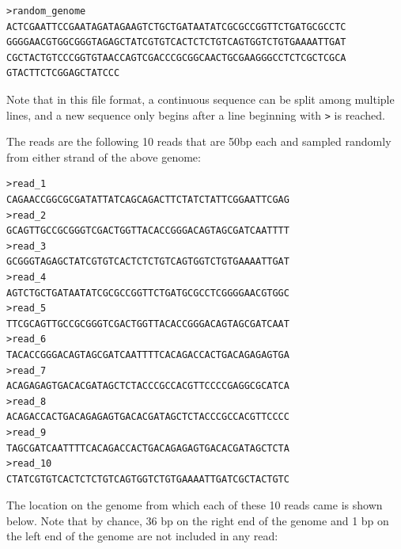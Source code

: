 \documentclass[12pt]{article}
\begin{document}

\begin{verbatim}
>random_genome
ACTCGAATTCCGAATAGATAGAAGTCTGCTGATAATATCGCGCCGGTTCTGATGCGCCTC
GGGGAACGTGGCGGGTAGAGCTATCGTGTCACTCTCTGTCAGTGGTCTGTGAAAATTGAT
CGCTACTGTCCCGGTGTAACCAGTCGACCCGCGGCAACTGCGAAGGGCCTCTCGCTCGCA
GTACTTCTCGGAGCTATCCC
\end{verbatim}

Note that in this file format, a continuous sequence can be split among multiple
lines, and a new sequence only begins after a line beginning with {\tt >} is
reached.

The reads are the following 10 reads that are 50bp each and sampled randomly
from either strand of the above genome:

\begin{verbatim}
>read_1
CAGAACCGGCGCGATATTATCAGCAGACTTCTATCTATTCGGAATTCGAG
>read_2
GCAGTTGCCGCGGGTCGACTGGTTACACCGGGACAGTAGCGATCAATTTT
>read_3
GCGGGTAGAGCTATCGTGTCACTCTCTGTCAGTGGTCTGTGAAAATTGAT
>read_4
AGTCTGCTGATAATATCGCGCCGGTTCTGATGCGCCTCGGGGAACGTGGC
>read_5
TTCGCAGTTGCCGCGGGTCGACTGGTTACACCGGGACAGTAGCGATCAAT
>read_6
TACACCGGGACAGTAGCGATCAATTTTCACAGACCACTGACAGAGAGTGA
>read_7
ACAGAGAGTGACACGATAGCTCTACCCGCCACGTTCCCCGAGGCGCATCA
>read_8
ACAGACCACTGACAGAGAGTGACACGATAGCTCTACCCGCCACGTTCCCC
>read_9
TAGCGATCAATTTTCACAGACCACTGACAGAGAGTGACACGATAGCTCTA
>read_10
CTATCGTGTCACTCTCTGTCAGTGGTCTGTGAAAATTGATCGCTACTGTC
\end{verbatim}

The location on the genome from which each of these 10 reads came is shown
below.  Note that by chance, 36 bp on the right end of the genome and 1 bp on
the left end of the genome are not included in any read:


\setcounter{forwardReads}{0}
\setcounter{rcReads}{1}

\newcommand{\ForwardRead}[2]{
	\addtocounter{readNumber}{1}
	\addtocounter{forwardReads}{-1}
	\setcounter{readPos}{#1}
	\addtocounter{readPos}{#2}
	\draw[->, style=thick] (#1, \arabic{forwardReads}) node[anchor=east]
									{\arabic{readNumber}.} -- (\arabic{readPos},
									\arabic{forwardReads});
}

\newcommand{\RcRead}[2]{
	\addtocounter{readNumber}{1}
	\addtocounter{rcReads}{1}
	\setcounter{readPos}{#1}
	\addtocounter{readPos}{#2}
	\draw[<-, style=thick] (#1, \arabic{rcReads}) node[anchor=east]
									{\arabic{readNumber}.} -- (\arabic{readPos},
									\arabic{rcReads});
}
\end{document}
